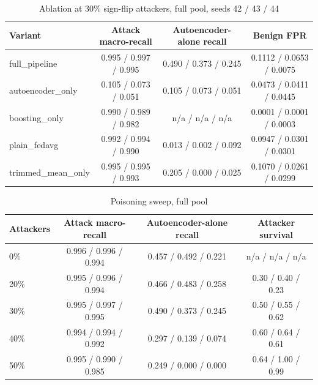 \begin{table}[H]
\centering
\small
\setlength{\tabcolsep}{3pt}
\renewcommand{\arraystretch}{1.15}
\begin{tabular}{|l|c|c|c|}
\hline
\textbf{Variant} & \textbf{Attack macro-recall} & \textbf{Autoencoder-alone recall} & \textbf{Benign FPR} \\ \hline
full\_pipeline & 0.995 / 0.997 / 0.995 & 0.490 / 0.373 / 0.245 & 0.1112 / 0.0653 / 0.0075 \\ \hline
autoencoder\_only & 0.105 / 0.073 / 0.051 & 0.105 / 0.073 / 0.051 & 0.0473 / 0.0411 / 0.0445 \\ \hline
boosting\_only & 0.990 / 0.989 / 0.982 & n/a / n/a / n/a & 0.0001 / 0.0001 / 0.0003 \\ \hline
plain\_fedavg & 0.992 / 0.994 / 0.990 & 0.013 / 0.002 / 0.092 & 0.0947 / 0.0301 / 0.0301 \\ \hline
trimmed\_mean\_only & 0.995 / 0.995 / 0.993 & 0.205 / 0.000 / 0.025 & 0.1070 / 0.0261 / 0.0299 \\ \hline
\end{tabular}
\caption{Ablation at 30\% sign-flip attackers, full pool, seeds 42 / 43 / 44}
\label{tab:full_ablation}
\end{table}

\begin{table}[H]
\centering
\small
\setlength{\tabcolsep}{3pt}
\renewcommand{\arraystretch}{1.15}
\begin{tabular}{|l|c|c|c|}
\hline
\textbf{Attackers} & \textbf{Attack macro-recall} & \textbf{Autoencoder-alone recall} & \textbf{Attacker survival} \\ \hline
0\% & 0.996 / 0.996 / 0.994 & 0.457 / 0.492 / 0.221 & n/a / n/a / n/a \\ \hline
20\% & 0.995 / 0.996 / 0.994 & 0.466 / 0.483 / 0.258 & 0.30 / 0.40 / 0.23 \\ \hline
30\% & 0.995 / 0.997 / 0.995 & 0.490 / 0.373 / 0.245 & 0.50 / 0.55 / 0.62 \\ \hline
40\% & 0.994 / 0.994 / 0.992 & 0.297 / 0.139 / 0.074 & 0.60 / 0.64 / 0.61 \\ \hline
50\% & 0.995 / 0.990 / 0.985 & 0.249 / 0.000 / 0.000 & 0.64 / 1.00 / 0.99 \\ \hline
\end{tabular}
\caption{Poisoning sweep, full pool}
\label{tab:full_sweep}
\end{table}

